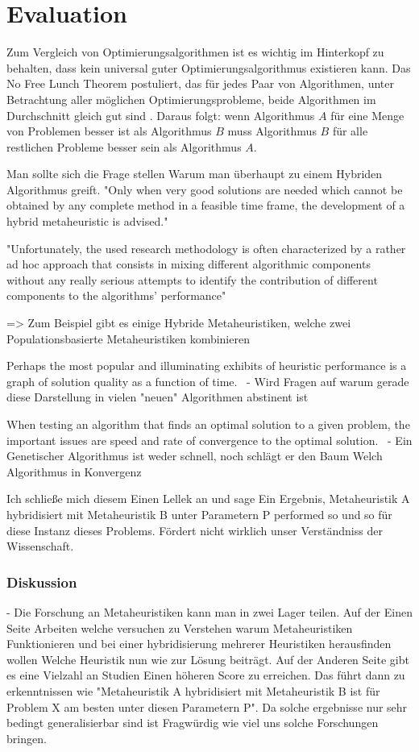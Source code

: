 \section*{Evaluation}
Zum Vergleich von Optimierungsalgorithmen ist es wichtig im Hinterkopf zu behalten, dass kein universal guter Optimierungsalgorithmus existieren kann. Das No Free Lunch Theorem postuliert, das für jedes Paar von Algorithmen, unter Betrachtung aller möglichen Optimierungsprobleme, beide Algorithmen im Durchschnitt gleich gut sind \cite*{NFL}. Daraus folgt: wenn Algorithmus $A$ für eine Menge von Problemen besser ist als Algorithmus $B$ muss Algorithmus $B$ für alle restlichen Probleme besser sein als Algorithmus $A$.


% 
Man sollte sich die Frage stellen Warum man überhaupt zu einem Hybriden Algorithmus greift. 
"Only when very good solutions are needed which cannot be obtained by any complete method in a feasible time frame, the development of a hybrid metaheuristic is advised." \cite*{MetaheuristicsSurvey}


"Unfortunately, the used research methodology is often
characterized by a rather ad hoc approach that consists in mixing different algorithmic components without any really serious
attempts to identify the contribution of different components to the
algorithms' performance" \cite*{MetaheuristicsSurvey}

=> Zum Beispiel gibt es einige Hybride Metaheuristiken, welche zwei Populationsbasierte Metaheuristiken kombinieren 


Perhaps the most popular and illuminating exhibits of heuristic performance is a graph 
of solution quality as a function of time.~\cite*{ComparisonGuidelines}
- Wird Fragen auf warum gerade diese Darstellung in vielen "neuen" Algorithmen 
abstinent ist

When testing an algorithm that finds an optimal solution to 
a given problem, the important issues are speed and rate of convergence to the optimal 
solution.~\cite*{ComparisonGuidelines}
- Ein Genetischer Algorithmus ist weder schnell, noch schlägt er den Baum Welch Algorithmus in Konvergenz

Ich schließe mich diesem Einen Lellek an und sage 
Ein Ergebnis, Metaheuristik A hybridisiert mit Metaheuristik B unter Parametern P performed so und so für diese Instanz dieses Problems. Fördert nicht wirklich unser Verständniss der Wissenschaft.

\subsubsection*{Diskussion}
- Die Forschung an Metaheuristiken kann man in zwei Lager teilen. Auf der Einen Seite Arbeiten welche versuchen zu Verstehen warum Metaheuristiken Funktionieren und bei einer hybridisierung mehrerer Heuristiken herausfinden wollen Welche Heuristik nun wie zur Lösung beiträgt. Auf der Anderen Seite gibt es eine Vielzahl an Studien Einen höheren Score zu erreichen. Das führt dann zu erkenntnissen wie "Metaheuristik A hybridisiert mit Metaheuristik B ist für Problem X am besten unter diesen Parametern P". Da solche ergebnisse nur sehr bedingt generalisierbar sind ist Fragwürdig wie viel uns solche Forschungen bringen.

